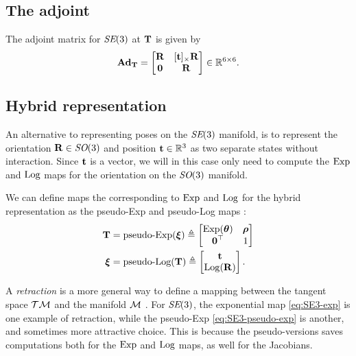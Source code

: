 \subsection{The adjoint}
The adjoint matrix for $\textit{SE}(3)$ at ${\boldsymbol{\mathbf{T}}}$ is given by
\begin{equation}
  \boldsymbol{\mathbf{Ad}}_{\boldsymbol{\mathbf{T}}} = 
  \begin{bmatrix}
    {\boldsymbol{\mathbf{R}}} & [{\boldsymbol{\mathbf{t}}}]_\times {\boldsymbol{\mathbf{R}}}\\
    \boldsymbol{\mathbf{0}} & {\boldsymbol{\mathbf{R}}}
  \end{bmatrix} \in {\mathbb R}^{6 \times 6}.
\end{equation}

\subsection{Hybrid representation} \label{sec:hybrid-representation}
An alternative to representing poses on the $\textit{SE}(3)$ manifold, is to represent the orientation ${\boldsymbol{\mathbf{R}}} \in \textit{SO}(3)$ and position ${\boldsymbol{\mathbf{t}}} \in {\mathbb R}^3$ as two separate states without interaction.
Since ${\boldsymbol{\mathbf{t}}}$ is a vector, we will in this case only need to compute the $\operatorname*{Exp}$ and $\operatorname*{Log}$ maps for the orientation on the $\textit{SO}(3)$ manifold.

We can define maps the corresponding to $\operatorname*{Exp}$ and $\operatorname*{Log}$ for the hybrid representation as the pseudo-Exp and pseudo-Log maps \cite{BlancoAOptimization}:
\begin{align}
    {\boldsymbol{\mathbf{T}}} &= \text{pseudo-Exp}({\boldsymbol{\mathbf{\xi}}}) \triangleq 
    \begin{bmatrix}
      \operatorname*{Exp}({\boldsymbol{\mathbf{\theta}}}) & {\boldsymbol{\mathbf{\rho}}}\\
      \boldsymbol{\mathbf{0}}^{\top} & 1
  \end{bmatrix} \label{eq:SE3-pseudo-exp}\\ 
  {\boldsymbol{\mathbf{\xi}}} &= \text{pseudo-Log}({\boldsymbol{\mathbf{T}}}) \triangleq 
  \begin{bmatrix}
    {\boldsymbol{\mathbf{t}}}\\
    \operatorname*{Log}({\boldsymbol{\mathbf{R}}})
  \end{bmatrix}.
\end{align}

A \emph{retraction} is a more general way to define a mapping between the tangent space $\mathcal{T}\mathcal{M}$ and the manifold $\mathcal{M}$ \cite{Forster2017, Dellaert2017, Absil2008OptimizationManifolds}.
For $\textit{SE}(3)$, the exponential map \eqref{eq:SE3-exp} is one example of retraction, while the pseudo-Exp \eqref{eq:SE3-pseudo-exp} is another, and sometimes more attractive choice.
This is because the pseudo-versions saves computations both for the $\operatorname*{Exp}$ and $\operatorname*{Log}$ maps, as well for the Jacobians.

